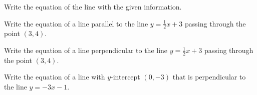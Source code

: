 \begin{activity}\label{A:0.1.4}
Write the equation of the line with the given information.
\ba
\item Write the equation of a line parallel to the line $y=\frac{1}{2}x+3$ passing through
    the point $(3,4)$.
\item Write the equation of a line perpendicular to the line $y=\frac{1}{2}x + 3$ passing
    through the point $(3,4)$.
\item Write the equation of a line with $y$-intercept $(0,-3)$ that is perpendicular to
    the line $y=-3x-1$.
\ea
\end{activity}\aftera
